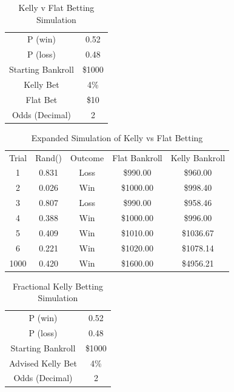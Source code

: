 \documentclass[12pt]{article}
\begin{document}
\begin{table}[H]
\centering
\begin{tabular}{cc}
P (win)           & 0.52   \\
P (loss)          & 0.48   \\
Starting Bankroll & \$1000 \\
Kelly Bet         & 4\%    \\
Flat Bet          & \$10   \\
Odds (Decimal)    & 2     
\end{tabular}
\caption{Kelly v Flat Betting Simulation}
\end{table}

\begin{table}[H]
\centering
\begin{tabular}{ccccc}
Trial & Rand() & Outcome & Flat Bankroll & Kelly Bankroll \\
1     & 0.831  & Loss    & \$990.00      & \$960.00       \\
2     & 0.026  & Win     & \$1000.00     & \$998.40       \\
3     & 0.807  & Loss    & \$990.00      & \$958.46       \\
4     & 0.388  & Win     & \$1000.00     & \$996.00       \\
5     & 0.409  & Win     & \$1010.00     & \$1036.67      \\
6     & 0.221  & Win     & \$1020.00     & \$1078.14      \\
1000  & 0.420  & Win     & \$1600.00     & \$4956.21     
\end{tabular}
\caption{Expanded Simulation of Kelly vs Flat Betting}
\end{table}

\begin{table}[H]
\centering
\begin{tabular}{cc}
P (win)           & 0.52   \\
P (loss)          & 0.48   \\
Starting Bankroll & \$1000 \\
Advised Kelly Bet         & 4\%    \\
Odds (Decimal)    & 2     
\end{tabular}
\caption{Fractional Kelly Betting Simulation}
\end{table}
\end{document}
